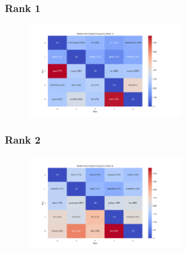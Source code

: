 \documentclass[11pt]{article}
\begin{document}
\subsubsection{Rank 1}
\begin{center}


\resizebox{\columnwidth}{!}
{
\TTRNFTable
}
\begin{figure}[h!]
  \includegraphics[width=0.6\textwidth]{figs/top_ten_rnf/rnf_t_rank_1.png}
\end{figure}
\end{center}

\pagebreak

\subsubsection{Rank 2}
\begin{center}


\resizebox{\columnwidth}{!}
{
\TTRNFTable
}
\begin{figure}[h!]
  \includegraphics[width=0.6\textwidth]{figs/top_ten_rnf/rnf_t_rank_2.png}
\end{figure}
\end{center}
\end{document}
